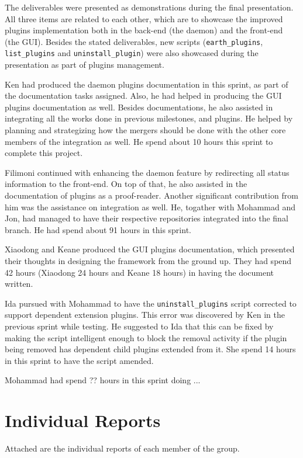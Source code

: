\documentclass{article}
\begin{document}
The deliverables were presented as demonstrations during the final presentation. All three items are related to each other, which are to showcase the improved plugins implementation both in the back-end (the daemon) and the front-end (the GUI). Besides the stated deliverables, new scripts (\texttt{earth\_plugins}, \texttt{list\_plugins} and \texttt{uninstall\_plugin}) were also showcased during the presentation as part of plugins management.

Ken had produced the daemon plugins documentation in this sprint, as part of the documentation tasks assigned. Also, he had helped in producing the GUI plugins documentation as well. Besides documentations, he also assisted in integrating all the works done in previous milestones, and plugins. He helped by planning and strategizing how the mergers should be done with the other core members of the integration as well. He spend about 10 hours this sprint to complete this project. 

Filimoni continued with enhancing the daemon feature by redirecting all status information to the front-end. On top of that, he also assisted in the documentation of plugins as a proof-reader. Another significant contribution from him was the assistance on integration as well. He, togather with Mohammad and Jon, had managed to have their respective repositories integrated into the final branch. He had spend about 91 hours in this sprint. 

Xiaodong and Keane produced the GUI plugins documentation, which presented their thoughts in designing the framework from the ground up. They had spend 42 hours (Xiaodong 24 hours and Keane 18 hours) in having the document written.

Ida pursued with Mohammad to have the \texttt{uninstall\_plugins} script corrected to support dependent extension plugins. This error was discovered by Ken in the previous sprint while testing. He suggested to Ida that this can be fixed by making the script intelligent enough to block the removal activity if the plugin being removed has dependent child plugins extended from it. She spend 14 hours in this sprint to have the script amended. 

Mohammad had spend ?? hours in this sprint doing ...
 
\section*{Individual Reports}

Attached are the individual reports of each member of the group. 









%




\end{document}
